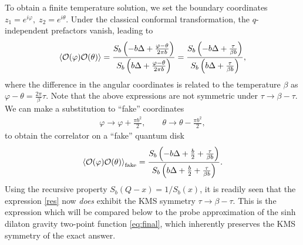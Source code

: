 \documentclass[a4paper,titlepage,12pt]{article}
\numberwithin{equation}{section}
\begin{document}
To obtain a finite temperature solution, we set the boundary coordinates $z_1=e^{i\varphi},\;z_2=e^{i\theta}$. Under the classical conformal transformation, the $q$-independent prefactors vanish, leading to 
\begin{align}
\label{eq:generalsolution}
    \braket{\mathcal{O}(\varphi)\mathcal{O}(\theta)}=\frac{S_b\left(-b\Delta+\frac{\varphi-\theta}{2\pi b}\right)}{S_b\left(b\Delta+\frac{\varphi-\theta}{2\pi b}\right)}=\frac{S_b\left(-b\Delta+\frac{\tau}{\beta b}\right)}{S_b\left(b\Delta+\frac{\tau}{\beta b}\right)},
\end{align}
where the difference in the angular coordinates is related to the temperature $\beta$ as $\varphi-\theta=\frac{2\pi}{\beta}\tau$. Note that the above expressions are not symmetric under $\tau\rightarrow \beta-\tau$. We can make a substitution to ``fake'' coordinates 
\begin{align}
    \varphi\rightarrow\varphi+\frac{\pi b^2}{2}, \qquad \theta\rightarrow\theta-\frac{\pi b^2}{2},
\end{align} 
to obtain the correlator on a ``fake'' quantum disk 
\begin{align}
\label{res}
\braket{\mathcal{O}(\varphi)\mathcal{O}(\theta)}_{\text{fake}}= \frac{S_b\left(-b\Delta+\frac{b}{2}+\frac{\tau}{\beta b}\right)}{S_b\left(b\Delta+\frac{b}{2}+\frac{\tau}{\beta b}\right)}.
\end{align}
Using the recursive property $S_b(Q-x)=1/S_b(x)$, it is readily seen that the expression \eqref{res} now \emph{does} exhibit the KMS symmetry $\tau\rightarrow \beta-\tau$. This is the expression which will be compared below to the probe approximation of the sinh dilaton gravity two-point function \eqref{eq:final}, which inherently preserves the KMS symmetry of the exact answer.
\end{document}
